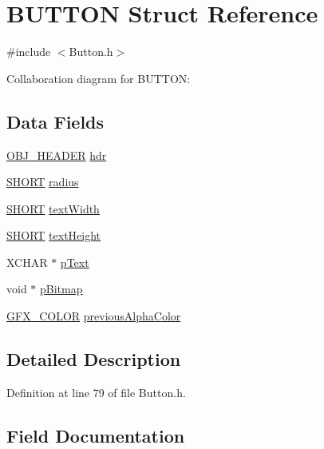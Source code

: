 \hypertarget{struct_b_u_t_t_o_n}{}\section{B\+U\+T\+T\+O\+N Struct Reference}
\label{struct_b_u_t_t_o_n}


{\ttfamily \#include $<$Button.\+h$>$}



Collaboration diagram for B\+U\+T\+T\+O\+N\+:
\subsection*{Data Fields}
\begin{DoxyCompactItemize}
\item 
\hyperlink{struct_o_b_j___h_e_a_d_e_r}{O\+B\+J\+\_\+\+H\+E\+A\+D\+E\+R} \hyperlink{struct_b_u_t_t_o_n_abeffaf353197a8a64fba6707b68ce0be}{hdr}
\item 
\hyperlink{_generic_type_defs_8h_ae9bb25d3afecf3bfab0fbe3c22c2050f}{S\+H\+O\+R\+T} \hyperlink{struct_b_u_t_t_o_n_ae5bf5300978dec1b6c69ee537e1c98f8}{radius}
\item 
\hyperlink{_generic_type_defs_8h_ae9bb25d3afecf3bfab0fbe3c22c2050f}{S\+H\+O\+R\+T} \hyperlink{struct_b_u_t_t_o_n_a9fbde8f74d930599fd9206a263e46cd6}{text\+Width}
\item 
\hyperlink{_generic_type_defs_8h_ae9bb25d3afecf3bfab0fbe3c22c2050f}{S\+H\+O\+R\+T} \hyperlink{struct_b_u_t_t_o_n_a40fa9c35391b0005032180b85e7afd34}{text\+Height}
\item 
X\+C\+H\+A\+R $\ast$ \hyperlink{struct_b_u_t_t_o_n_a934b5563cdaf14803728ff3a7b7e8c7f}{p\+Text}
\item 
void $\ast$ \hyperlink{struct_b_u_t_t_o_n_aef9bed8e1a29e17226ccbd9a3d81f9e1}{p\+Bitmap}
\item 
\hyperlink{gfxcolors_8h_a0658edb6e7bd88d6e9a185711893441c}{G\+F\+X\+\_\+\+C\+O\+L\+O\+R} \hyperlink{struct_b_u_t_t_o_n_ae1b76b0df5f37334d126b747ff99b5ca}{previous\+Alpha\+Color}
\end{DoxyCompactItemize}


\subsection{Detailed Description}


Definition at line 79 of file Button.\+h.



\subsection{Field Documentation}
\hypertarget{struct_b_u_t_t_o_n_abeffaf353197a8a64fba6707b68ce0be}{}
